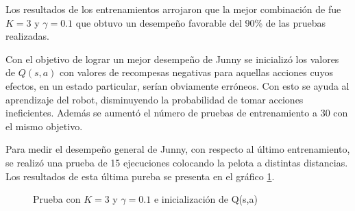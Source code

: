 %
%
%

Los resultados de los entrenamientos arrojaron que la mejor combinaci\'on de fue $K = 3$ y $ \gamma = 0.1 $ que obtuvo un desempeño favorable del 90\% de las pruebas realizadas.

Con el objetivo de lograr un mejor desempeño de Junny se inicializ\'o los valores de $Q(s,a)$ con valores de recompesas negativas para aquellas acciones cuyos efectos, en un estado particular, serían obviamente err\'oneos. Con esto se ayuda al aprendizaje del robot, disminuyendo la probabilidad de tomar acciones ineficientes. Adem\'as se aumentó el n\'umero de pruebas de entrenamiento a 30 con el mismo objetivo.

Para medir el desempeño general de Junny, con respecto al último entrenamiento, se realizó una prueba de 15 ejecuciones colocando la pelota a distintas distancias. Los resultados de esta \'ultima pureba se presenta en el gr\'afico \ref{fig:mejor}. 

\begin{figure}[h]
\caption{Prueba con $K = 3$ y $ \gamma = 0.1 $ e inicializaci\'on de Q(s,a)}
\label{fig:mejor}
\end{figure} 

